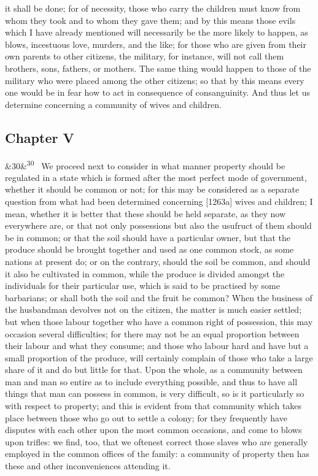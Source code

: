 \documentclass[12pt]{article}
\newcommand{\para}[1][]{\par\noindent\ifx&#1&\else\textsuperscript{\footnotesize #1}~\fi}
\begin{document}
it shall be done; for of necessity, those who carry the children must know from whom they took and to whom they gave them; and by this means those evils which I have already mentioned will necessarily be the more likely to happen, as blows, incestuous love, murders, and the like; for those who are given from their own parents to other citizens, the military, for instance, will not call them brothers, sons, fathers, or mothers. The same thing would happen to those of the military who were placed among the other citizens; so that by this means every one would be in fear how to act in consequence of consanguinity. And thus let us determine concerning a community of wives and children.

\subsection*{Chapter V}

\para[30] We proceed next to consider in what manner property should be regulated in a state which is formed after the most perfect mode of government, whether it should be common or not; for this may be considered as a separate question from what had been determined concerning [1263a] wives and children; I mean, whether it is better that these should be held separate, as they now everywhere are, or that not only possessions but also the usufruct of them should be in common; or that the soil should have a particular owner, but that the produce should be brought together and used as one common stock, as some nations at present do; or on the contrary, should the soil be common, and should it also be cultivated in common, while the produce is divided amongst the individuals for their particular use, which is said to be practised by some barbarians; or shall both the soil and the fruit be common? When the business of the husbandman devolves not on the citizen, the matter is much easier settled; but when those labour together who have a common right of possession, this may occasion several difficulties; for there may not be an equal proportion between their labour and what they consume; and those who labour hard and have but a small proportion of the produce, will certainly complain of those who take a large share of it and do but little for that. Upon the whole, as a community between man and man so entire as to include everything possible, and thus to have all things that man can possess in common, is very difficult, so is it particularly so with respect to property; and this is evident from that community which takes place between those who go out to settle a colony; for they frequently have disputes with each other upon the most common occasions, and come to blows upon trifles: we find, too, that we oftenest correct those slaves who are generally employed in the common offices of the family: a community of property then has these and other inconveniences attending it.
\end{document}

